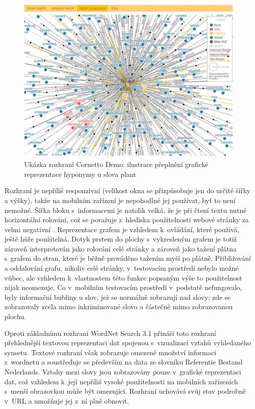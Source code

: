 \documentclass[a4paper,11pt,openany,twoside]{book}
\newcommand\ex{\textsf}
\begin{document}
					\begin{figure}[h]
						\centering
						\includegraphics[width=1.0\textwidth]{wncorplant.png}
						\caption{Ukázka rozhraní Cornetto Demo: ilustrace přeplnění grafické reprezentace hyponymy u slova \ex{plant}}
						\label{fig:wncorplant}
					\end{figure}

					Rozhraní je nepříliš responzivní (velikost okna se přizpůsobuje jen do určité šířky a výšky), takže na mobilním zařízení je nepohodlné jej používat, byť to není nemožné. Šířka bloku s~informacemi je natolik velká, že je při čtení textu nutné horizontální rolování, což se považuje z~hlediska použitelnosti webové stránky za velmi negativní \parencite{nn2005scrollbar, richards2004web}. Reprezentace grafem je vzhledem k~ovládání, které používá, ještě hůře použitelná. Dotyk prstem do plochy s~vykresleným grafem je totiž zároveň interpretován jako rolování celé stránky a zároveň jako tažení plátna s~grafem do stran, které je běžně prováděno tažením myší po plátně. Přibližování a oddalování grafu, nikoliv celé stránky, v~testovacím prostředí nebylo možné vůbec, ale vzhledem k~vlastnostem této funkce popsaným výše to použitelnost nijak neomezuje. Co v~mobilním testovacím prostředí v~podstatě nefungovalo, byly informační bubliny u slov, jež se normálně zobrazují nad slovy; zde se zobrazovaly zcela mimo inkriminované slovo a částečně mimo zobrazovanou plochu.

					Oproti základnímu rozhraní WordNet Search 3.1 přináší toto rozhraní přehlednější textovou reprezentaci dat spojenou s~vizualizací vztahů vyhledaného synsetu. Textové rozhraní však zobrazuje omezené množství informací z~wordnetu a soustřeďuje se především na data ze slovníku Referentie Bestand Nederlands. Vztahy mezi slovy jsou zobrazovány pouze v~grafické reprezentaci dat, což vzhledem k~její nepříliš vysoké použitelnosti na mobilních zařízeních s~menší obrazovkou může být omezující. Rozhraní uchovává svůj stav podrobně v~URL a umožňuje jej z~ní plně obnovit.
\end{document}
